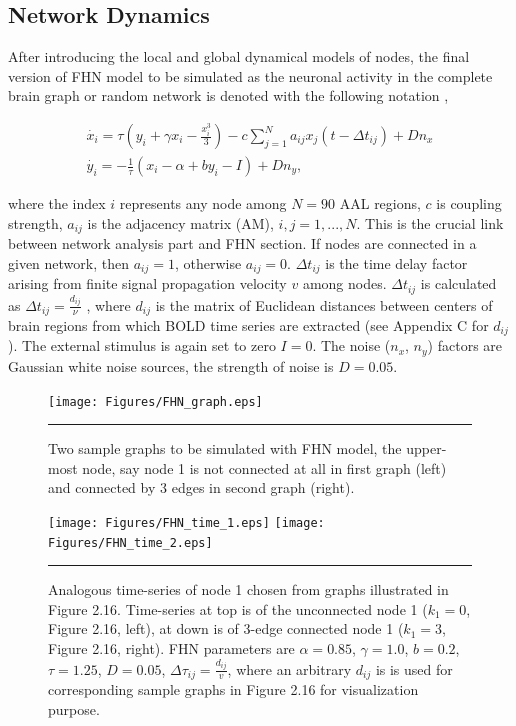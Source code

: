 \subsection{Network Dynamics}

After introducing the local and global dynamical models of nodes, the final version of FHN model to be simulated as the neuronal activity in the complete brain graph or random network is denoted with the following notation \citep{VUK13},  
 
\begin{subequations}
 \begin{align}\dot{x_i} = \tau \left( y_i + \gamma x_i - \frac{x_i^3}{3} \right) -c \sum_{j=1}^N a_{ij}x_j(t - \Delta t_{ij}) +Dn_x \label{eqn: frobenius 17}\\  \dot{y_i} = -\frac{1}{\tau} (x_i - \alpha + b y_i - I ) +Dn_y \label{eqn: frobenius 18}  , \end{align} 
\end{subequations}

where the index $i$ represents any node among $N=90$ AAL regions, $c$ is coupling strength, $a_{ij}$ is the adjacency matrix (AM), $i,j=1,...,N$. This is the crucial link between network analysis part and FHN section. If nodes are connected in a given network, then $a_{ij}=1$, otherwise $a_{ij}=0$. $\Delta t_{ij}$ is the time delay factor arising from finite signal propagation velocity $v$ among nodes. $\Delta t_{ij}$ is calculated as $\Delta t_{ij}=\frac{d_{ij}}{\nu}$ \citep{GHO08, GHO08a, DEC09}, where $d_{ij}$ is the matrix of Euclidean distances between centers of brain regions from which BOLD time series are extracted \citep{KAI06} (see Appendix C for $d_{ij}$). The external stimulus is again set to zero $I=0$. The noise ($n_x$, $n_y$) factors are Gaussian white noise sources, the strength of noise is $D=0.05$.
 
\begin{figure}[htbp]
  \centering
	\texttt{[image: Figures/FHN\_graph.eps]}
 
    \rule{35em}{0.5pt}
    \caption[FHN Graph]{Two sample graphs to be simulated with FHN model, the upper-most node, say node 1 is not connected at all in first graph (left) and connected by 3 edges in second graph (right).  }
  \label{fig:FHN Graph}	
\end{figure}


\begin{figure}[htbp]
  \centering
	\texttt{[image: Figures/FHN\_time\_1.eps]}
 	\texttt{[image: Figures/FHN\_time\_2.eps]}
    \rule{35em}{0.5pt}
    \caption[FHN Time Series]{Analogous time-series of node 1 chosen from graphs illustrated in Figure 2.16. Time-series at top is of the unconnected node 1 ($k_1=0$, Figure 2.16, left), at down is of 3-edge connected node 1 ($k_1=3$, Figure 2.16, right). FHN parameters are  $\alpha=0.85$, $\gamma=1.0$, $b=0.2$, $\tau=1.25$, $D=0.05$, $\Delta \tau_{ij} = \frac{ d_{ij}}{v}$, where an arbitrary $d_{ij}$ is is used for corresponding sample graphs in Figure 2.16 for visualization purpose.  }
  \label{fig:FHN Time Series}	
\end{figure}

